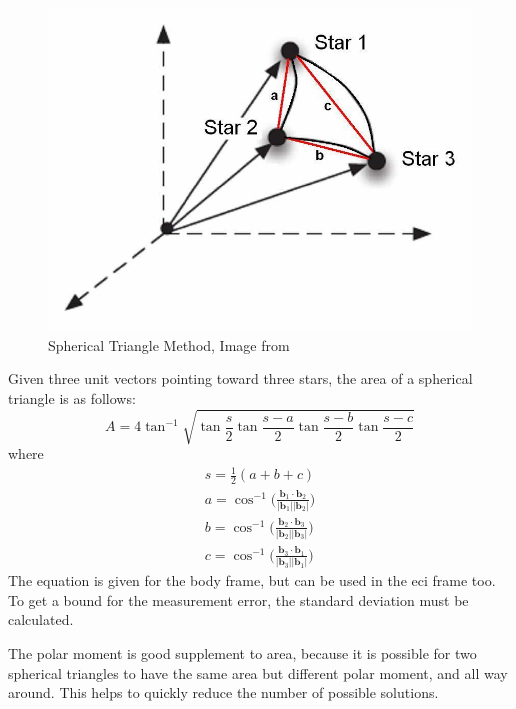 \documentclass[12pt,a4paper,twoside]{article}
\begin{document}
\begin{figure}[ht]
\includegraphics[scale=0.29]{spherical_triangle_method.jpg}
\centering
\caption[Spherical Triangle Method]{Spherical Triangle Method, Image from \citet{cole2004fast}}
\label{fig:spherical_triangle_method}
\end{figure}
Given three unit vectors pointing toward three stars, the area of a spherical triangle is as follows:
\begin{equation}
A = 4\tan^{-1}\sqrt{\tan\frac{s}{2}\tan\frac{s-a}{2}\tan\frac{s-b}{2}\tan\frac{s-c}{2}}
\end{equation}
where
\begin{subequations}
\begin{align*}
s = \frac{1}{2}(a + b + c) \\
a = \cos^{-1} \bigg(\frac{\bm{b}_1 \cdot \bm{b}_2}{|\bm{b}_1||\bm{b}_2|}\bigg) \\
b = \cos^{-1} \bigg(\frac{\bm{b}_2 \cdot \bm{b}_3}{|\bm{b}_2||\bm{b}_3|}\bigg) \\
c = \cos^{-1} \bigg(\frac{\bm{b}_3 \cdot \bm{b}_1}{|\bm{b}_3||\bm{b}_1|}\bigg) 
\end{align*}
\end{subequations}
The equation is given for the body frame, but can be used in the \gls{eci} frame too. To get a bound for the measurement error, the standard deviation must be calculated.

The polar moment is good supplement to area, because it is possible for two spherical triangles to have the same area but different polar moment, and all way around. This helps to quickly reduce the number of possible solutions.
\end{document}
